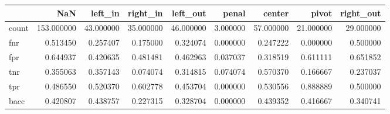 \begin{tabular}{lrrrrrrrr}
\toprule
{} &         NaN &    left\_in &   right\_in &   left\_out &     penal &     center &      pivot &  right\_out \\
\midrule
count &  153.000000 &  43.000000 &  35.000000 &  46.000000 &  3.000000 &  57.000000 &  21.000000 &  29.000000 \\
fnr   &    0.513450 &   0.257407 &   0.175000 &   0.324074 &  0.000000 &   0.247222 &   0.000000 &   0.500000 \\
fpr   &    0.644937 &   0.420635 &   0.481481 &   0.462963 &  0.037037 &   0.318519 &   0.611111 &   0.651852 \\
tnr   &    0.355063 &   0.357143 &   0.074074 &   0.314815 &  0.074074 &   0.570370 &   0.166667 &   0.237037 \\
tpr   &    0.486550 &   0.520370 &   0.602778 &   0.453704 &  0.000000 &   0.530556 &   0.888889 &   0.500000 \\
bacc  &    0.420807 &   0.438757 &   0.227315 &   0.328704 &  0.000000 &   0.439352 &   0.416667 &   0.340741 \\
\bottomrule
\end{tabular}

